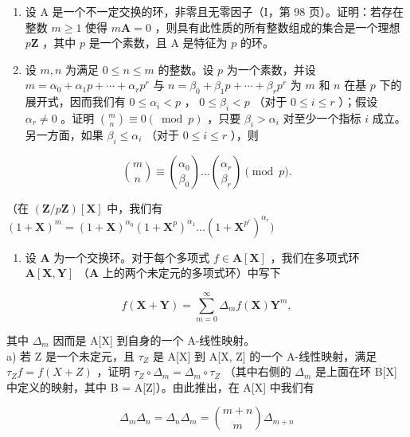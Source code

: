 \BourbakiExerciseGroup

\begin{enumerate}
\def\labelenumi{\arabic{enumi})}
\item
  设 A 是一个不一定交换的环，非零且无零因子（I，第 98 页）。证明：若存在整数 \(m \geqslant 1\) 使得 \(m\mathbf{A} = 0\) ，则具有此性质的所有整数组成的集合是一个理想 \(p\mathbf{Z}\) ，其中 \(p\) 是一个素数，且 A 是特征为 \(p\) 的环。
\item
  设 \(m, n\) 为满足 \(0 \leqslant n \leqslant m\) 的整数。设 \(p\) 为一个素数，并设 \(m = \alpha_0 + \alpha_1p + \cdots + \alpha_rp^r\) 与 \(n = \beta_0 + \beta_1p + \cdots + \beta_rp^r\) 为 \(m\) 和 \(n\) 在基 \(p\) 下的展开式，因而我们有 \(0 \leqslant \alpha_i < p\) ， \(0 \leqslant \beta_i < p\) （对于 \(0 \leqslant i \leqslant r\) ）；假设 \(\alpha_r \neq 0\) 。证明 \(\binom{m}{n} \equiv 0 (\bmod p)\) ，只要 \(\beta_i > \alpha_i\) 对至少一个指标 \(i\) 成立。另一方面，如果 \(\beta_i \leqslant \alpha_i\) （对于 \(0 \leqslant i \leqslant r\) ），则
\end{enumerate}

\[
\binom {m} {n} \equiv \binom {\alpha_ {0}} {\beta_ {0}} \dots \binom {\alpha_ {r}} {\beta_ {r}} \pmod {p}  .
\]

（在 \((\mathbf{Z} / p\mathbf{Z})[\mathbf{X}]\) 中，我们有 \((1 + \mathbf{X})^m = (1 + \mathbf{X})^{\alpha_0}(1 + \mathbf{X}^p)^{\alpha_1}\dots (1 + \mathbf{X}^{p^r})^{\alpha_r})\)

\begin{enumerate}
\def\labelenumi{\arabic{enumi})}
\setcounter{enumi}{2}
\tightlist
\item
  设 \(\mathbf{A}\) 为一个交换环。对于每个多项式 \(f \in \mathbf{A}[\mathbf{X}]\) ，我们在多项式环 \(\mathbf{A}[\mathbf{X}, \mathbf{Y}]\) （\(\mathbf{A}\) 上的两个未定元的多项式环）中写下
\end{enumerate}

\[
f (\mathbf {X} + \mathbf {Y}) = \sum_ {m = 0} ^ {\infty} \Delta_ {m} f (\mathbf {X}) \mathbf {Y} ^ {m},
\]

其中 \(\Delta_{m}\) 因而是 A{[}X{]} 到自身的一个 A-线性映射。\\
a) 若 Z 是一个未定元，且 \(\tau_{Z}\) 是 A{[}X{]} 到 A{[}X, Z{]} 的一个 A-线性映射，满足 \(\tau_{Z}f = f(X + Z)\) ，证明 \(\tau_{Z} \circ \Delta_{m} = \Delta_{m} \circ \tau_{Z}\) （其中右侧的 \(\Delta_{m}\) 是上面在环 B{[}X{]} 中定义的映射，其中 B = A{[}Z{]}）。由此推出，在 A{[}X{]} 中我们有

\[
\Delta_ {m} \Delta_ {n} = \Delta_ {n} \Delta_ {m} = \binom {m + n} {m} \Delta_ {m + n}
\]


